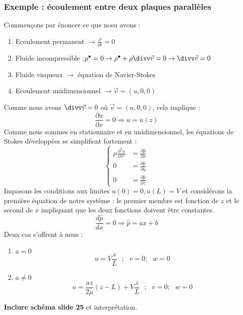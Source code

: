 \subsubsection{Exemple : écoulement entre deux plaques parallèles}
Commençons par énoncer ce que nosu avons : 
\begin{enumerate}
	\item Ecoulement permanent $\rightarrow \frac{\partial}{\partial t}=0$
	\item Fluide incompressible :$\rho^\bullet=0 \rightarrow \rho^\bullet + \rho
	      \divv\vec{v}=0 \rightarrow \divv \vec{v}=0$
	\item Fluide visqueux $\rightarrow$ équation de Navier-Stokes
	\item Ecoulement unidimensionnel $\rightarrow \vec{v} = (u,0,0)$
\end{enumerate}				
Comme nous avons $\divv \vec v=0$ où $\vec{v}=(u,0,0)$, cela implique :
\begin{equation}
	\frac{\partial u}{\partial x} = 0 \Rightarrow u = u(z)
\end{equation}
Comme nous sommes en stationnaire et en unidimensionnel, les équations 
de Stokes développées se simplifient fortement :
\begin{equation}
	\left\{\begin{array}{ll}
	\mu \frac{\partial^2u}{\partial z^2} &= \frac{\partial \hat{p}}{\partial x}\\
	0 &= \frac{\partial \hat{p}}{\partial y}\\
	0 &= \frac{\partial \hat{p}}{\partial z}
	\end{array}\right.
\end{equation}
Imposons les conditions aux limites $u(0)=0, u(L)=V$ et considérons la première 
équation de notre système : le premier membre est fonction de $z$ et le second de
$x$ impliquant que les deux fonctions doivent être constantes.
\begin{equation}
	\frac{d\hat{p}}{dx}= 0 \Rightarrow \hat{p}=ax+b
\end{equation}
Deux cas s'offrent à nous : 
\begin{enumerate}
	\item $a=0$\\
	      \begin{equation}
	      	u = V\frac{z}{L}\ \ \ ;\ \ \ v=0;\ \ \ w=0
	      \end{equation}
	\item $a\neq0$\\
	      \begin{equation}
	      	u = \frac{az}{2\mu}(z-L) + V\frac{z}{L}\ \ \ ;\ \ \ v=0;\ \ \ w=0
	      \end{equation}
\end{enumerate}
\textbf{Inclure schéma slide 25} et interprétation.
		
